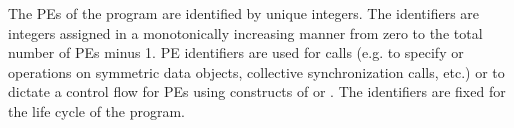 The \ac{PE}{}s of the \openshmem{} program are identified by unique integers. The identifiers are integers assigned in a monotonically increasing manner from zero to the total number of \ac{PE}s minus 1. \ac{PE} identifiers are used for \openshmem{} calls (e.g. to specify \PUT{} or \GET{} operations on symmetric data objects, collective synchronization calls, etc.) or to dictate a control flow for \ac{PE}s using constructs of \Clang{} or \Fortran. The identifiers are fixed for the life cycle of the \openshmem{} program.


